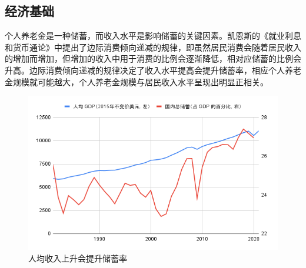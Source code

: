 \documentclass[a4paper,zihao=5]{ctexart}
\begin{document}
\subsection{经济基础}

个人养老金是一种储蓄，而收入水平是影响储蓄的关键因素。凯恩斯的《就业利息和货币通论》中提出了边际消费倾向递减的规律，即虽然居民消费会随着居民收入的增加而增加，但增加的收入中用于消费的比例会逐渐降低，相对应储蓄的比例会升高。边际消费倾向递减的规律决定了收入水平提高会提升储蓄率，相应个人养老金规模就可能越大，个人养老金规模与居民收入水平呈现出明显正相关。
\begin{figure}[H]
    \centering
    \includegraphics[width=\linewidth]{img/人均收入上升会提升储蓄率.png}
    \caption{人均收入上升会提升储蓄率}
\end{figure}
\end{document}
